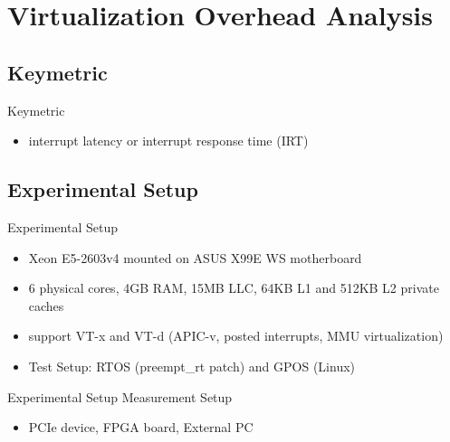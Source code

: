 \documentclass[10pt,hyperref={hyperfootnotes=false}, xcolor={usenames, dvipsnames}]{beamer}
\begin{document}
\section{Virtualization Overhead Analysis}
\subsection{Keymetric}
\begin{frame}{Keymetric}
  \begin{itemize}
  \item {interrupt latency or interrupt response time (IRT)}
  \end{itemize}
  	\begingroup
	
	\endgroup
\end{frame}

\subsection{Experimental Setup}
\begin{frame}{Experimental Setup}
  \begin{itemize}
  \item {Xeon E5-2603v4 mounted on ASUS X99E WS motherboard}
  \item {6 physical cores, 4GB RAM, 15MB LLC, 64KB L1 and 512KB L2 private caches}
  \item {support VT-x  and VT-d (APIC-v, posted interrupts, MMU virtualization)}
  \item {Test Setup: RTOS (preempt\_rt patch) and GPOS (Linux)}
  \end{itemize}
\end{frame}

\begin{frame}{Experimental Setup} {Measurement Setup}
  \begin{itemize}
  \item {PCIe device, FPGA board, External PC}
	\begingroup
	
	\endgroup
  \end{itemize}
\end{frame}

\end{document}
